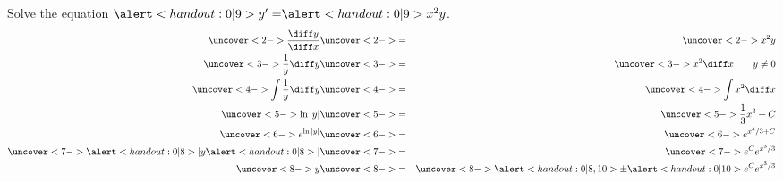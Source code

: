 \begin{frame}
\begin{example}[Example 3, p. 617]
Solve the equation $\alert<handout:0| 9>{y' =} \alert<handout:0| 9>{x^2y}$.
\belowdisplayskip=0pt
\abovedisplayskip=0pt
\begin{eqnarray*}
\uncover<2->{%
\frac{\diff y}{\diff x}%
}%
& \uncover<2->{ = } &%
\uncover<2->{%
x^2y%
}\\%
\uncover<3->{%
\frac{1}{y}\diff y%
}%
& \uncover<3->{ = } &%
\uncover<3->{%
x^2\diff x \qquad y\neq 0%
}\\%
\uncover<4->{%
\int \frac{1}{y}\diff y%
}%
& \uncover<4->{ = } &%
\uncover<4->{%
\int x^2\diff x%
}\\%
\uncover<5->{%
\ln |y|%
}%
& \uncover<5->{ = } &%
\uncover<5->{%
\frac{1}{3}x^3 + C%
}\\%
\uncover<6->{%
e^{\ln |y|}%
}%
& \uncover<6->{ = } &%
\uncover<6->{%
e^{x^3/3 + C}%
}\\%
\uncover<7->{%
\alert<handout:0| 8>{|}y\alert<handout:0| 8>{|}%
}%
& \uncover<7->{ = } &%
\uncover<7->{%
e^Ce^{x^3/3}%
}\\%
\uncover<8->{%
y%
}%
& \uncover<8->{ = } &%
\uncover<8->{%
\alert<handout:0| 8,10>{\pm} \alert<handout:0| 10>{e^C}e^{x^3/3}%
}%
\end{eqnarray*}
%
%
\end{example}
\end{frame}
